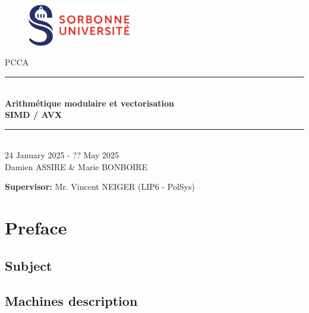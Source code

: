 \documentclass[a4paper]{article}
\begin{document}
\thispagestyle{plain}
\begin{titlepage}
    \begin{figure}[h]
        \centering
        \includegraphics[width=0.4\textwidth]{su.png}
    \end{figure}
    \vspace{1cm}

    \begin{center}
        {\LARGE PCCA}\\[0.3cm]
        \rule{\linewidth}{0.5mm} \\[0.4cm]
        {\huge \textbf{Arithmétique modulaire et vectorisation\\ SIMD / AVX}}\\[0.4cm]
        \rule{\linewidth}{0.5mm} \\[1cm]
        {\large 24 January 2025 - ?? May 2025}\\[3cm]

        {\Large Damien ASSIRE \& Marie BONBOIRE}


    \end{center}

    \vfill
\begin{flushleft}{\large
    \textbf{Supervisor:} Mr. Vincent NEIGER (LIP6 - PolSys)\\
    }
\end{flushleft}
\end{titlepage}
\newpage

\tableofcontents
\newpage

\section{Preface}

\subsection{Subject}
\subsection{Machines description}


\end{document}
